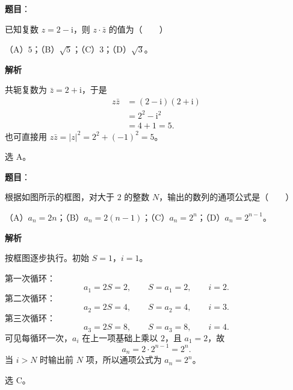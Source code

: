\begin{answer}

\textbf{题目}：

已知复数 $z=2-\mathrm i$，则 $z\cdot\bar z$ 的值为\mbox{（　　）}

（A）$5$；（B）$\sqrt5$；（C）$3$；（D）$\sqrt3$。

\textbf{解析}

共轭复数为 $\bar z=2+\mathrm i$，于是
\nopagebreak[4]
\[\begin{aligned}
z\bar z&=(2-\mathrm i)(2+\mathrm i)\\
&=2^2-\mathrm i^2\\
&=4+1=5.
\end{aligned}\]
也可直接用 $z\bar z=|z|^2=2^2+(-1)^2=5$。

选 A。


\end{answer}
\begin{answer}

\textbf{题目}：

根据如图所示的框图，对大于 $2$ 的整数 $N$，输出的数列的通项公式是\mbox{（　　）}
\nopagebreak[4]
\begin{center}\end{center}
\nopagebreak[4]
（A）$a_n=2n$；（B）$a_n=2(n-1)$；（C）$a_n=2^n$；（D）$a_n=2^{n-1}$。

\textbf{解析}

按框图逐步执行。初始 $S=1$，$i=1$。

第一次循环：
\nopagebreak[4]
\[a_1=2S=2,\qquad S=a_1=2,\qquad i=2.\]
第二次循环：
\nopagebreak[4]
\[a_2=2S=4,\qquad S=a_2=4,\qquad i=3.\]
第三次循环：
\nopagebreak[4]
\[a_3=2S=8,\qquad S=a_3=8,\qquad i=4.\]
可见每循环一次，$a_i$ 在上一项基础上乘以 $2$，且 $a_1=2$，故
\nopagebreak[4]
\[a_n=2\cdot2^{n-1}=2^n.\]
当 $i>N$ 时输出前 $N$ 项，所以通项公式为 $a_n=2^n$。

选 C。


\end{answer}

